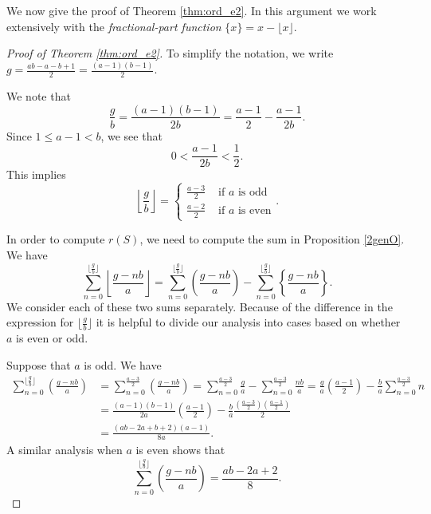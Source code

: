 \documentclass[12pt]{amsart}
\theoremstyle{plain}\newtheorem{proposition}{Proposition}[section]
\begin{document}
We now give the proof of Theorem \ref{thm:ord_e2}.  In this argument we work extensively with the \emph{fractional-part function} $\{x\} = x - \lfloor x \rfloor$.
\begin{proof}[Proof of Theorem \ref{thm:ord_e2}]
To simplify the notation, we write $g = \frac{ab-a-b+1}{2} = \frac{(a-1)(b-1)}{2}$.

We note that 
\[
\frac{g}{b} = \frac{(a-1)(b-1)}{2b} = \frac{a-1}{2}-\frac{a-1}{2b}.
\]
Since $1 \le a-1 < b$, we see that 
\[
0 < \frac{a-1}{2b} < \frac{1}{2}.
\]
This implies 
\begin{equation}\label{eqn:floor}
\left\lfloor \frac{g}{b} \right\rfloor = \begin{cases} \frac{a-3}{2} & \text{ if } a \text{ is odd} \\
\frac{a-2}{2} & \text{ if } a \text{ is even} 
\end{cases}.
\end{equation}

In order to compute $r(S)$, we need to compute the sum in Proposition \ref{2genO}.  We have
\begin{equation}\label{eqn:sums}
\sum_{n=0}^{\lfloor \frac{g}{b}\rfloor} \left\lfloor \frac{g-nb}{a} \right\rfloor = \sum_{n=0}^{\lfloor \frac{g}{b}\rfloor} \left(\frac{g-nb}{a} \right) - \sum_{n=0}^{\lfloor\frac{g}{b}\rfloor} \left\{\frac{g-nb}{a} \right\}.
\end{equation}
We consider each of these two sums separately.  Because of the difference in the expression for $\lfloor \frac{g}{b} \rfloor$ it is helpful to divide our analysis into cases based on whether $a$ is even or odd.

Suppose that $a$ is odd.  We have
\begin{align}
\sum_{n=0}^{\lfloor \frac{g}{b}\rfloor} \left(\frac{g-nb}{a} \right) & =  \sum_{n=0}^{ \frac{a-3}{2}} \left(\frac{g-nb}{a} \right) = \sum_{n=0}^{ \frac{a-3}{2}} \frac{g}{a} - \sum_{n=0}^{ \frac{a-3}{2}} \frac{nb}{a}  =  \frac{g}{a}\left( \frac{a-1}{2}\right) - \frac{b}{a} \sum_{n=0}^{ \frac{a-3}{2}} n \nonumber\\
&  =   \frac{(a-1)(b-1)}{2a} \left( \frac{a-1}{2} \right)- \frac{b}{a} \frac{\left(\frac{a-3}{2}\right) \left(\frac{a-1}{2}\right)}{2} \nonumber \\
& =  \frac{(ab - 2a + b + 2)(a - 1)}{8a}. \label{eqn:main_term_odd}
\end{align}
A similar analysis when $a$ is even shows that 
\begin{equation}\label{eqn:main_term_even}
\sum_{n=0}^{\lfloor \frac{g}{b}\rfloor} \left(\frac{g-nb}{a} \right) = \frac{ab - 2a + 2}{8}.
\end{equation}


\end{proof}
\end{document}
